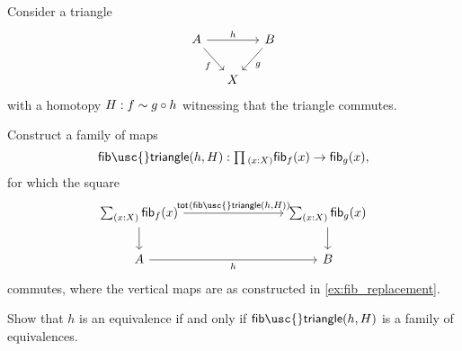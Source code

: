 \begin{exercises}
\begin{comment}
defined by $\lam{(y,q)}(a,y)$ is an equivalence.
\end{comment}
\item \label{ex:fiber_trans}Consider a triangle
\begin{equation*}
\begin{tikzcd}[column sep=small]
A \arrow[rr,"h"] \arrow[dr,swap,"f"] & & B \arrow[dl,"g"] \\
& X
\end{tikzcd}
\end{equation*}
with a homotopy $H:f\sim g\circ h$ witnessing that the triangle commutes. 
\begin{subexenum}
\item Construct a family of maps
\begin{equation*}
\mathsf{fib\usc{}triangle}(h,H):\prd{x:X}\fib{f}{x}\to\fib{g}{x},
\end{equation*}
for which the square
\begin{equation*}
\begin{tikzcd}[column sep=8em]
\sm{x:X}\fib{f}{x} \arrow[r,"\total{\mathsf{fib\usc{}triangle}(h,H)}"] \arrow[d] & \sm{x:X}\fib{g}{x} \arrow[d] \\
A \arrow[r,swap,"h"] & B
\end{tikzcd}
\end{equation*}
commutes, where the vertical maps are as constructed in \cref{ex:fib_replacement}.
\item Show that $h$ is an equivalence if and only if $\mathsf{fib\usc{}triangle}(h,H)$ is a family of equivalences.
\end{subexenum}
\begin{comment}
\item Let $f:A\to B$ be a map, and let $s,t : \fib{f}{b}$. Consider the function
\begin{equation*}
\varphi : (s=t)\to \fib{\apfunc{f}}{\ct{\proj 2(s)}{\proj 2(t)^{-1}}}
\end{equation*}
given by $\varphi(\refl{s})=(\refl{\proj 1(s)},\mathsf{right\usc{}inv}(\proj 2(s))^{-1})$. Show that this map is an equivalence. Conclude that for any $q:f(x)=f(y)$ we have an equivalence
\begin{equation*}
((x,q)=(y,\refl{f(y)})) \simeq \fib{\apfunc{f}}{q}.
\end{equation*}
\item Construct an equivalence 
\begin{equation*}
\eqv{\big(\sm{x:A}f(x)=y\big)}{\big(\sm{x:A}y=f(x)\big)}.
\end{equation*}
\end{comment}
\end{exercises}
